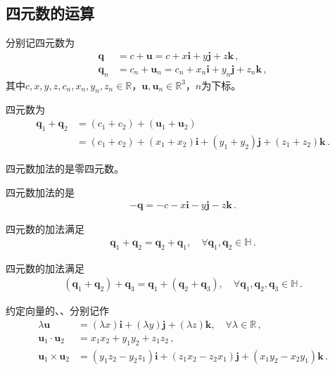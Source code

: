 \subsection{四元数的运算}\label{sub:四元数的运算}
分别记四元数为
\begin{align}
    {\bm q}   & =c+{\bm u}=c+x\mathbf{i}+y\mathbf{j}+z\mathbf{k}\, ,             \\
    {\bm q}_n & =c_n+{\bm u}_n=c_n+x_n\mathbf{i}+y_n\mathbf{j}+z_n\mathbf{k}\, ,
\end{align}
其中$c, x, y, z, c_n, x_n, y_n, z_n\in\mathbb{R}$，${\bm u}, {\bm u}_n\in\mathbb{R}^3$，$n$为下标。
\begin{definition}
    四元数为
    \begin{align}
        {\bm q}_1+{\bm q}_2 & =(c_1+c_2)+({\bm u}_1+{\bm u}_2)\nonumber                                  \\
                            & =(c_1+c_2)+(x_1+x_2)\mathbf{i}+(y_1+y_2)\mathbf{j}+(z_1+z_2)\mathbf{k}\, .
    \end{align}
\end{definition}
\begin{proposition}
    四元数加法的是零四元数。
\end{proposition}
\begin{proposition}
    四元数加法的是
    \begin{align}
        -{\bm q}=-c-x\mathbf{i}-y\mathbf{j}-z\mathbf{k}\, .
    \end{align}
\end{proposition}
\begin{proposition}
    四元数的加法满足
    \begin{align}
        {\bm q}_1+{\bm q}_2={\bm q}_2+{\bm q}_1, \quad \forall {\bm q}_1, {\bm q}_2\in \mathbb{H}\, .
    \end{align}
\end{proposition}
\begin{proposition}
    四元数的加法满足
    \begin{align}
        ({\bm q}_1+{\bm q}_2)+{\bm q}_3={\bm q}_1+({\bm q}_2+{\bm q}_3), \quad \forall {\bm q}_1, {\bm q}_2, {\bm q}_3\in \mathbb{H}\, .
    \end{align}
\end{proposition}
\begin{notation}
    约定向量的、、分别记作
    \begin{align}
        \lambda{\bm u}           & =(\lambda x)\mathbf{i}+(\lambda y)\mathbf{j}+(\lambda z)\mathbf{k},\quad \forall \lambda\in\mathbb{R}\, , \\
        {\bm u}_1\cdot{\bm u}_2  & =x_1x_2+y_1y_2+z_1z_2\, ,                                                                                 \\
        {\bm u}_1\times{\bm u}_2 & =(y_1z_2-y_2z_1)\mathbf{i}+(z_1x_2-z_2x_1)\mathbf{j}+(x_1y_2-x_2y_1)\mathbf{k}\, .
    \end{align}
\end{notation}

